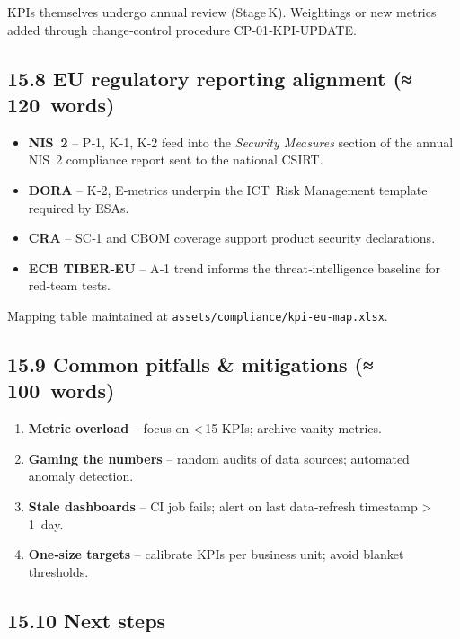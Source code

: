 \documentclass[
  english,
]{article}
\providecommand{\tightlist}{%
  \setlength{\itemsep}{0pt}\setlength{\parskip}{0pt}}
\begin{document}
KPIs themselves undergo annual review (Stage\,K). Weightings or new
metrics added through change‑control procedure CP‑01‑KPI‑UPDATE.

\subsection{15.8 EU regulatory reporting alignment
(≈\,120~words)}\label{eu-regulatory-reporting-alignment-120-words}

\begin{itemize}
\tightlist
\item
  \textbf{NIS~2} -- P‑1, K‑1, K‑2 feed into the \emph{Security Measures}
  section of the annual NIS~2 compliance report sent to the national
  CSIRT.
\item
  \textbf{DORA} -- K‑2, E‑metrics underpin the ICT~Risk Management
  template required by ESAs.
\item
  \textbf{CRA} -- SC‑1 and CBOM coverage support product security
  declarations.
\item
  \textbf{ECB TIBER‑EU} -- A‑1 trend informs the threat‑intelligence
  baseline for red‑team tests.
\end{itemize}

Mapping table maintained at \texttt{assets/compliance/kpi‑eu‑map.xlsx}.

\subsection{15.9 Common pitfalls \& mitigations
(≈\,100~words)}\label{common-pitfalls-mitigations-100-words-1}

\begin{enumerate}
\def\labelenumi{\arabic{enumi}.}
\tightlist
\item
  \textbf{Metric overload} -- focus on \textless\,15 KPIs; archive
  vanity metrics.
\item
  \textbf{Gaming the numbers} -- random audits of data sources;
  automated anomaly detection.
\item
  \textbf{Stale dashboards} -- CI job fails; alert on last data‑refresh
  timestamp \textgreater\,1~day.
\item
  \textbf{One‑size targets} -- calibrate KPIs per business unit; avoid
  blanket thresholds.
\end{enumerate}

\subsection{15.10 Next steps}\label{next-steps-2}
\end{document}
